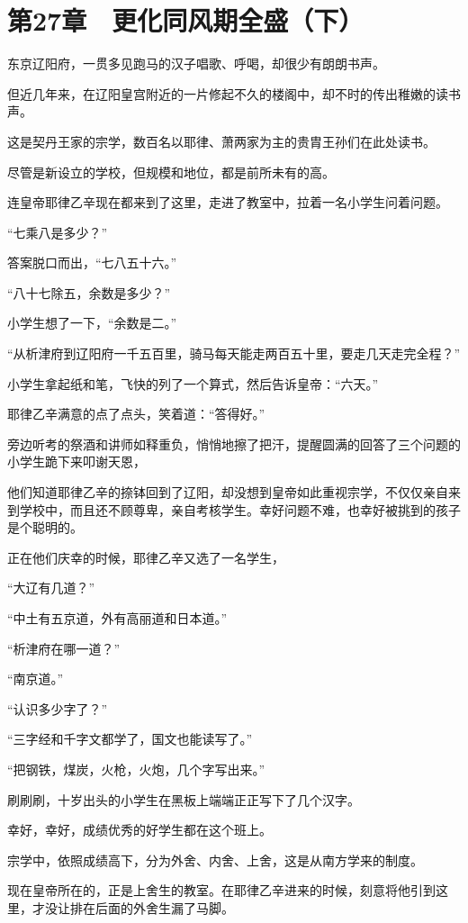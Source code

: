 \section{第27章　更化同风期全盛（下）}

东京辽阳府，一贯多见跑马的汉子唱歌、呼喝，却很少有朗朗书声。

但近几年来，在辽阳皇宫附近的一片修起不久的楼阁中，却不时的传出稚嫩的读书声。

这是契丹王家的宗学，数百名以耶律、萧两家为主的贵胄王孙们在此处读书。

尽管是新设立的学校，但规模和地位，都是前所未有的高。

连皇帝耶律乙辛现在都来到了这里，走进了教室中，拉着一名小学生问着问题。

“七乘八是多少？”

答案脱口而出，“七八五十六。”

“八十七除五，余数是多少？”

小学生想了一下，“余数是二。”

“从析津府到辽阳府一千五百里，骑马每天能走两百五十里，要走几天走完全程？”

小学生拿起纸和笔，飞快的列了一个算式，然后告诉皇帝：“六天。”

耶律乙辛满意的点了点头，笑着道：“答得好。”

旁边听考的祭酒和讲师如释重负，悄悄地擦了把汗，提醒圆满的回答了三个问题的小学生跪下来叩谢天恩，

他们知道耶律乙辛的捺钵回到了辽阳，却没想到皇帝如此重视宗学，不仅仅亲自来到学校中，而且还不顾尊卑，亲自考核学生。幸好问题不难，也幸好被挑到的孩子是个聪明的。

正在他们庆幸的时候，耶律乙辛又选了一名学生，

“大辽有几道？”

“中土有五京道，外有高丽道和日本道。”

“析津府在哪一道？”

“南京道。”

“认识多少字了？”

“三字经和千字文都学了，国文也能读写了。”

“把钢铁，煤炭，火枪，火炮，几个字写出来。”

刷刷刷，十岁出头的小学生在黑板上端端正正写下了几个汉字。

幸好，幸好，成绩优秀的好学生都在这个班上。

宗学中，依照成绩高下，分为外舍、内舍、上舍，这是从南方学来的制度。

现在皇帝所在的，正是上舍生的教室。在耶律乙辛进来的时候，刻意将他引到这里，才没让排在后面的外舍生漏了马脚。

